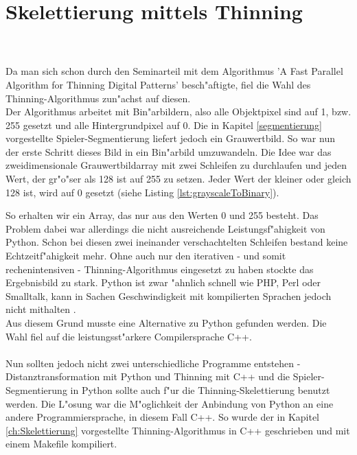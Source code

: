 \section{Skelettierung mittels Thinning} 
\label{implThinning}
 \\ \\
Da man sich schon durch den Seminarteil mit dem Algorithmus 'A Fast Parallel Algorithm for Thinning Digital Patterns' besch"aftigte, fiel die Wahl des Thinning-Algorithmus zun"achst auf diesen. \\
Der Algorithmus arbeitet mit Bin"arbildern, also alle Objektpixel sind auf 1, bzw. 255 gesetzt und alle Hintergrundpixel auf 0. Die in Kapitel \ref{segmentierung} vorgestellte Spieler-Segmentierung liefert jedoch ein Grauwertbild. So war nun der erste Schritt dieses Bild in ein Bin"arbild umzuwandeln. Die Idee war das zweidimensionale Grauwertbildarray mit zwei Schleifen zu durchlaufen und jeden Wert, der gr"o"ser als 128 ist auf 255 zu setzen. Jeder Wert der kleiner oder gleich 128 ist, wird auf 0 gesetzt (siehe Listing \ref{lst:grayscaleToBinary}). 

So erhalten wir ein Array, das nur aus den Werten 0 und 255 besteht. Das Problem dabei war allerdings die nicht ausreichende Leistungsf"ahigkeit von Python. Schon bei diesen zwei ineinander verschachtelten Schleifen bestand keine Echtzeitf"ahigkeit mehr. Ohne auch nur den iterativen - und somit rechenintensiven - Thinning-Algorithmus eingesetzt zu haben stockte das Ergebnisbild zu stark. Python ist zwar "ahnlich schnell wie PHP, Perl oder Smalltalk, kann in Sachen Geschwindigkeit mit kompilierten Sprachen jedoch nicht mithalten \cite{python}. \\Aus diesem Grund musste eine Alternative zu Python gefunden werden. Die Wahl fiel auf die leistungsst"arkere Compilersprache C++. \\ \\
Nun sollten jedoch nicht zwei unterschiedliche Programme entstehen - Distanztransformation mit Python und Thinning mit C++ und die Spieler-Segmentierung in Python sollte auch f"ur die Thinning-Skelettierung benutzt werden. Die L"osung war die M"oglichkeit der Anbindung von Python an eine andere Programmiersprache, in diesem Fall C++. So wurde der in Kapitel \ref{ch:Skelettierung} vorgestellte Thinning-Algorithmus in C++ geschrieben und mit einem Makefile kompiliert.

